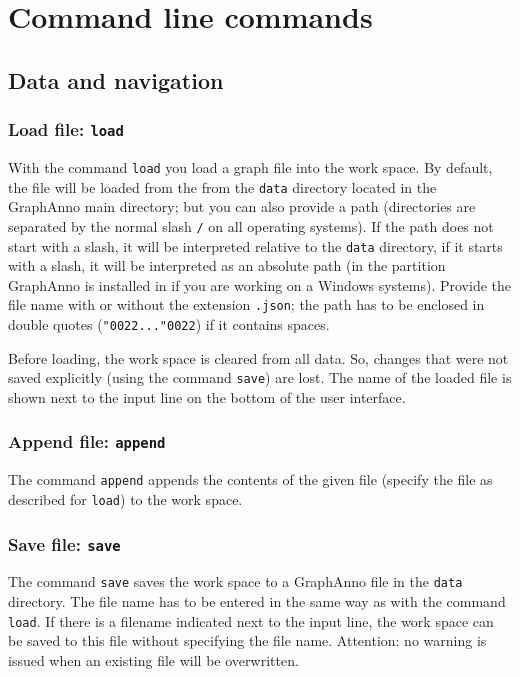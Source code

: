 \documentclass[12pt]{scrartcl}
\newcommand{\quo}{\char"0022}
\begin{document}
\section{Command line commands}

\subsection{Data and navigation}

\subsubsection{Load file: \texttt{load}}

With the command \texttt{load} you load a graph file into the work space.
By default, the file will be loaded from the from the \texttt{data} directory located in the GraphAnno main directory; but you can also provide a path (directories are separated by the normal slash \texttt{/} on all operating systems).
If the path does not start with a slash, it will be interpreted relative to the \texttt{data} directory, if it starts with a slash, it will be interpreted as an absolute path (in the partition GraphAnno is installed in if you are working on a Windows systems).
Provide the file name with or without the extension \texttt{.json}; the path has to be enclosed in double quotes (\texttt{\quo...\quo}) if it contains spaces.

Before loading, the work space is cleared from all data.
So, changes that were not saved explicitly (using the command \texttt{save}) are lost.
The name of the loaded file is shown next to the input line on the bottom of the user interface.


\subsubsection{Append file: \texttt{append}}

The command \texttt{append} appends the contents of the given file (specify the file as described for \texttt{load}) to the work space.


\subsubsection{Save file: \texttt{save}}

The command \texttt{save} saves the work space to a GraphAnno file in the \texttt{data} directory.
The file name has to be entered in the same way as with the command \texttt{load}.
If there is a filename indicated next to the input line, the work space can be saved to this file without specifying the file name.
Attention: no warning is issued when an existing file will be overwritten.
\end{document}
